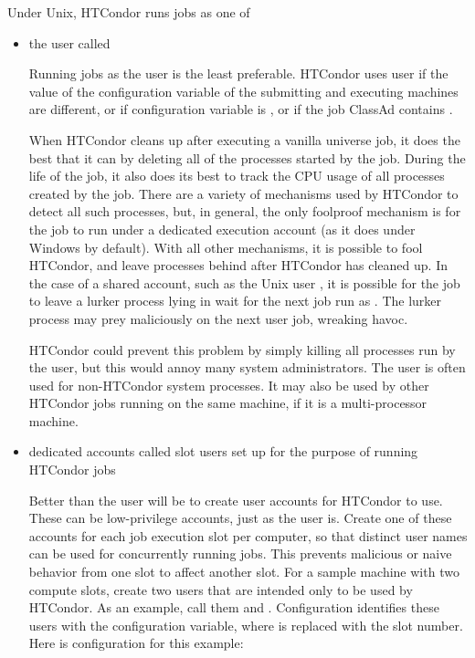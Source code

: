 Under Unix, HTCondor runs jobs as one of
\begin{itemize}
\item the user called 

Running jobs as the  user is the least preferable.
HTCondor uses user
 if the value of the  configuration
variable of the submitting and executing machines are different,
or if configuration variable  
is ,
or if the job ClassAd contains .  

When HTCondor cleans up after executing a vanilla universe job, 
it does the best that it can by deleting all of the processes 
started by the job.  
During the life of the job, it also does its best to track the
CPU usage of all processes created by the job.  There are a variety of
mechanisms used by HTCondor to detect all such processes, but, in
general, the only foolproof mechanism is for the job to run under a
dedicated execution account (as it does under Windows by default).
With all other mechanisms, it is possible to fool HTCondor, and leave
processes behind after HTCondor has cleaned up.  
In the case of a shared account, such as the Unix user , 
it is possible for the
job to leave a lurker process lying in wait for the next job run as
.  The lurker process may prey maliciously on the next
 user job, wreaking havoc.

HTCondor could prevent this problem by simply killing all processes run by
the  user, but this would annoy many system administrators.
The  user is often used for non-HTCondor system processes.
It may also be used by other HTCondor jobs running on the same machine, if
it is a multi-processor machine.

\item dedicated accounts called slot users
 set up for the purpose of running HTCondor jobs

Better than the  user will be to 
create user accounts for HTCondor to use.
These can be low-privilege accounts,
just as the  user is.
Create one of these accounts for each job execution slot per computer,
so that distinct user names can be used for concurrently running jobs.
This prevents malicious or naive behavior from one slot to affect another slot.
For a sample machine with two compute slots,
create two users that are intended only to be used by HTCondor.
As an example, call them  and .
Configuration identifies these users
with the  configuration variable,
where  is replaced with the slot number.
Here is configuration for this example:


\end{itemize}
